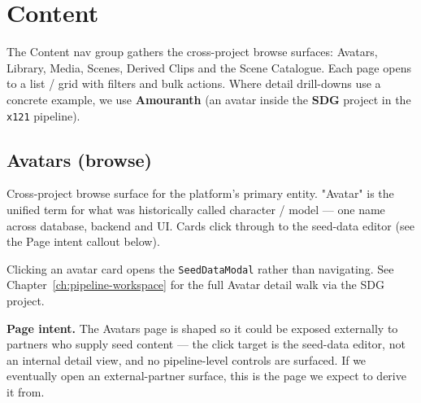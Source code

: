 \chapter{Content}
\label{ch:content}

The Content nav group gathers the cross-project browse surfaces: Avatars,
Library, Media, Scenes, Derived Clips and the Scene Catalogue. Each page
opens to a list / grid with filters and bulk actions. Where detail drill-downs
use a concrete example, we use \textbf{Amouranth} (an avatar inside the
\textbf{SDG} project in the \texttt{x121} pipeline).

\section{Avatars (browse)}
\label{sec:content-avatars}

Cross-project browse surface for the platform's primary entity. "Avatar" is the
unified term for what was historically called character / model — one name across
database, backend and UI. Cards click through to the seed-data editor (see the
Page intent callout below).


\begin{itemize}
\end{itemize}

Clicking an avatar card opens the \texttt{SeedDataModal} rather than navigating.
See Chapter~\ref{ch:pipeline-workspace} for the full Avatar detail walk via
the SDG project.

\begin{designnote}
\textbf{Page intent.} The Avatars page is shaped so it could be exposed
externally to partners who supply seed content — the click target is the
seed-data editor, not an internal detail view, and no pipeline-level
controls are surfaced. If we eventually open an external-partner surface,
this is the page we expect to derive it from.
\end{designnote}

